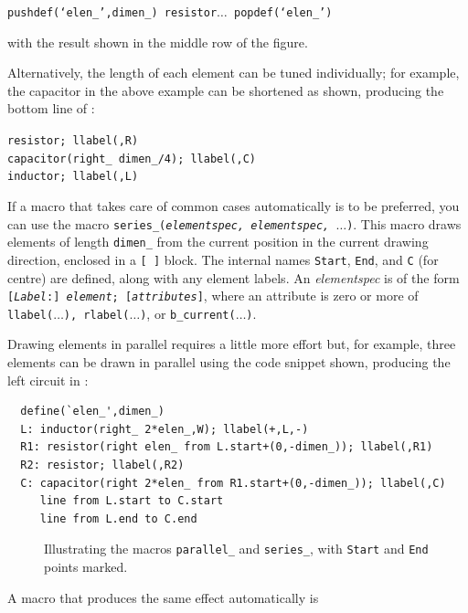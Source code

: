 {\tt pushdef(`elen\_',dimen\_)
 resistor$\ldots$ popdef(`elen\_')}

\noindent
with the result shown in the middle row of the figure.

Alternatively, the length of each element can be tuned individually; for
example, the capacitor in the above example can be shortened as shown,
producing the bottom line of :

{\tt resistor; llabel(,R)\\
 \hspace*{\parindent}%
  capacitor(right\_ dimen\_/4); llabel(,C)\\
 \hspace*{\parindent}%
  inductor; llabel(,L)}

If a macro that takes care of common cases automatically is to be preferred,
you can use the macro {\tt series\_({\sl elementspec, elementspec, $\ldots$})}.
This macro draws elements of length {\tt dimen\_} from the current
position in the current drawing
direction, enclosed in a {\tt [ ]} block.  The internal names
{\tt Start}, {\tt End}, and {\tt C} (for centre) are defined, along with
any element labels.  An {\sl elementspec} is of the form
{\tt[{\sl Label}:] {\sl element}; [{\sl attributes}]},
where an attribute is zero or more of
 {\tt llabel($\ldots$), rlabel($\ldots$)}, or {\tt b\_current($\ldots$)}.

Drawing elements in parallel requires a little more effort but, for example,
three elements can be drawn in parallel using the code snippet shown,
producing the left circuit in :
\begin{verbatim}
  define(`elen_',dimen_)
  L: inductor(right_ 2*elen_,W); llabel(+,L,-)
  R1: resistor(right elen_ from L.start+(0,-dimen_)); llabel(,R1)
  R2: resistor; llabel(,R2)
  C: capacitor(right 2*elen_ from R1.start+(0,-dimen_)); llabel(,C)
     line from L.start to C.start
     line from L.end to C.end
\end{verbatim}

\begin{figure}[ht]
   
   \vspace*{-\baselineskip}
   \caption{Illustrating the macros {\tt parallel\_} and {\tt series\_},
       with {\tt Start} and {\tt End} points marked.}
   \label{ParSeries}
   \end{figure}

A macro that produces the same effect automatically is


